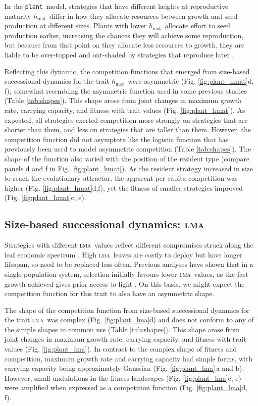 \documentclass[a4paper,11pt]{article}
\newcommand{\plant}{{\tt plant}}
\newcommand{\hmat}{\ensuremath{h_{\text{mat}}}}
\newcommand{\lma}{\textsc{lma}}
\begin{document}
In the \plant\ model, strategies that have different heights at reproductive maturity \hmat\ differ in how they allocate resources between growth and seed production at different sizes. Plants with lower \hmat\ allocate effort to seed production earlier, increasing the chances they will achieve some reproduction, but because from that point on they allocate less resources to growth, they are liable to be over-topped and out-shaded by strategies that reproduce later \citep{Falster-2017}.

Reflecting this dynamic, the competition functions that emerged from size-based successional dynamics for the trait \hmat\ were asymmetric (Fig. \ref{fig:plant_hmat}d, f), somewhat resembling the asymmetric function used in some previous studies \citep{Law-1997, Kisdi-1999, Geritz-1999, Egas-2004, Calcagno-2006, DAndrea-2013} (Table \ref{tab:shapes}). This shape arose from joint changes in maximum growth rate, carrying capacity, and fitness with trait values (Fig. \ref{fig:plant_hmat}). As expected, all strategies exerted competition more strongly on strategies that are shorter than them, and less on strategies that are taller than them. However, the competition function did not asymptote like the logistic function that has previously been used to model asymmetric competition (Table \ref{tab:shapes}). The shape of the function also varied with the position of the resident type (compare panels d and f in Fig. \ref{fig:plant_hmat}). As the resident strategy increased in size to reach the evolutionary attractor, the apparent per capita competition was higher (Fig. \ref{fig:plant_hmat}d,f), yet the fitness of smaller strategies improved (Fig. \ref{fig:plant_hmat}c, e).

\subsection{Size-based successional dynamics: \lma}

Strategies with different \lma\ values reflect different compromises struck along the leaf economic spectrum \citep{Reich-1997,Wright-2004}. High \lma\ leaves are costly to deploy but have longer lifespan, so need to be replaced less often. Previous analyses have shown that in a single population system, selection initially favours lower \lma\ values, as the fast growth achieved gives prior access to light \citep{Falster-2017}. On this basis, we might expect the competition function for this trait to also have an asymmetric shape.

The shape of the competition function from size-based successional dynamics for the trait \lma\ was complex (Fig. \ref{fig:plant_lma}d) and does not conform to any of the simple shapes in common use (Table \ref{tab:shapes}). This shape arose from joint changes in maximum growth rate, carrying capacity, and fitness with trait values (Fig. \ref{fig:plant_lma}). In contrast to the complex shape of fitness and competition, maximum growth rate and carrying capacity had simple forms, with carrying capacity being approximately Gaussian (Fig. \ref{fig:plant_lma}\,a and b). However, small undulations in the fitness landscapes (Fig. \ref{fig:plant_lma}c, e) were amplified when expressed as a competition function (Fig. \ref{fig:plant_lma}d, f). 
\end{document}

